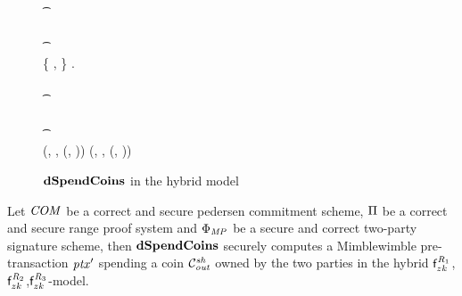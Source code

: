\begin{figure}
{\begin{varwidth}{\textwidth}
{        \pcif {}  \\
        \t \pcreturn \cnstFalsum \\
        \pcif {}  \\
        \t \pcreturn \cnstFalsum \\
        \{ \varPubKey, \varRand \} \opFunResult \funStarAlt{\varPreTx}.\varSigContext \\
        \pcif {}  \\
        \t \pcreturn \cnstFalsum \\
        \pcif {}  \\
        \t \pcreturn \cnstFalsum \\
        \pcreturn (\funStarAlt{\varPreTx}, \funStar{\varSpendableCoinAlice}, (\varSecKeyAlice, \varNonceAlice)) \< \< \pcreturn (\funStarAlt{\varPreTx}, \funStar{\varSpendableCoinCarol}, (\varSecKeyCarol, \varNonceCarol))
        }
    \end{varwidth}
    }
    \caption{$\mathbf{dSpendCoins}$ in the hybrid model} \label{fig:atom:hybrid-dsend}
\end{figure}

\begin{theorem}
    \label{teo:atom:sec-dspend}
    Let $\mathit{COM}$ be a correct and secure pedersen commitment scheme, $\Pi$ be a correct and secure range proof system and $\Phi_{\mathit{MP}}$ be a secure and correct two-party signature scheme, then $\mathbf{dSpendCoins}$ securely computes a Mimblewimble pre-transaction ${\mathit{ptx}}'$ spending a coin $\mathcal{C}_{\mathit{out}}^{\mathit{sh}}$ owned by the two parties in the hybrid $\mathsf{f}^{\mathit{R}_1}_{zk}$,$\mathsf{f}^{\mathit{R}_2}_{zk}$,$\mathsf{f}^{\mathit{R}_3}_{zk}$-model.
\end{theorem}

